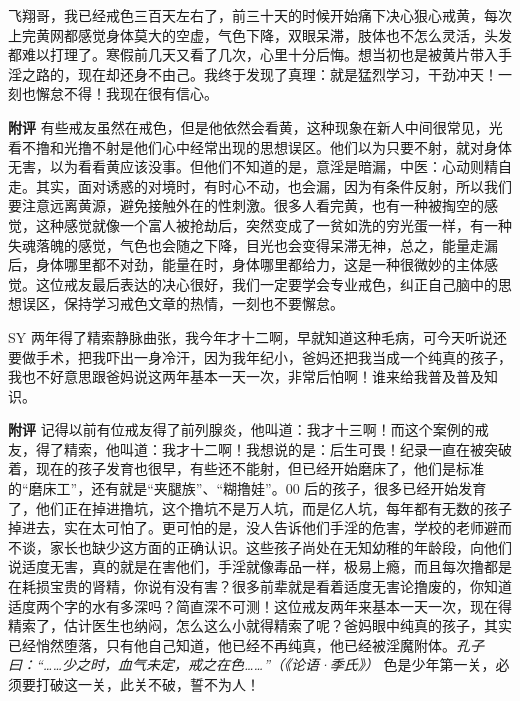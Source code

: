\begin{case}
    飞翔哥，我已经戒色三百天左右了，前三十天的时候开始痛下决心狠心戒黄，每次上完黄网都感觉身体莫大的空虚，气色下降，双眼呆滞，肢体也不怎么灵活，头发都难以打理了。寒假前几天又看了几次，心里十分后悔。想当初也是被黄片带入手淫之路的，现在却还身不由己。我终于发现了真理：就是猛烈学习，干劲冲天！一刻也懈怠不得！我现在很有信心。

    \textbf{附评} 有些戒友虽然在戒色，但是他依然会看黄，这种现象在新人中间很常见，光看不撸和光撸不射是他们心中经常出现的思想误区。他们以为只要不射，就对身体无害，以为看看黄应该没事。但他们不知道的是，意淫是暗漏，中医：心动则精自走。其实，面对诱惑的对境时，有时心不动，也会漏，因为有条件反射，所以我们要注意远离黄源，避免接触外在的性刺激。很多人看完黄，也有一种被掏空的感觉，这种感觉就像一个富人被抢劫后，突然变成了一贫如洗的穷光蛋一样，有一种失魂落魄的感觉，气色也会随之下降，目光也会变得呆滞无神，总之，能量走漏后，身体哪里都不对劲，能量在时，身体哪里都给力，这是一种很微妙的主体感觉。这位戒友最后表达的决心很好，我们一定要学会专业戒色，纠正自己脑中的思想误区，保持学习戒色文章的热情，一刻也不要懈怠。
\end{case}

\begin{case}
    SY 两年得了精索静脉曲张，我今年才十二啊，早就知道这种毛病，可今天听说还要做手术，把我吓出一身冷汗，因为我年纪小，爸妈还把我当成一个纯真的孩子，我也不好意思跟爸妈说这两年基本一天一次，非常后怕啊！谁来给我普及普及知识。

    \textbf{附评} 记得以前有位戒友得了前列腺炎，他叫道：我才十三啊！而这个案例的戒友，得了精索，他叫道：我才十二啊！我想说的是：后生可畏！纪录一直在被突破着，现在的孩子发育也很早，有些还不能射，但已经开始磨床了，他们是标准的“磨床工”，还有就是“夹腿族”、“糊撸娃”。00 后的孩子，很多已经开始发育了，他们正在掉进撸坑，这个撸坑不是万人坑，而是亿人坑，每年都有无数的孩子掉进去，实在太可怕了。更可怕的是，没人告诉他们手淫的危害，学校的老师避而不谈，家长也缺少这方面的正确认识。这些孩子尚处在无知幼稚的年龄段，向他们说适度无害，真的就是在害他们，手淫就像毒品一样，极易上瘾，而且每次撸都是在耗损宝贵的肾精，你说有没有害？很多前辈就是看着适度无害论撸废的，你知道适度两个字的水有多深吗？简直深不可测！这位戒友两年来基本一天一次，现在得精索了，估计医生也纳闷，怎么这么小就得精索了呢？爸妈眼中纯真的孩子，其实已经悄然堕落，只有他自己知道，他已经不再纯真，他已经被淫魔附体。\textit{孔子曰：“……少之时，血气未定，戒之在色……”（《论语·季氏》）} 色是少年第一关，必须要打破这一关，此关不破，誓不为人！
\end{case}

